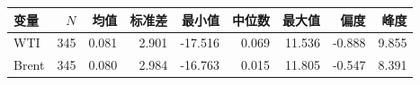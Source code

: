 \begin{tabular}{lrrrrrrrr}
\toprule
变量 & $N$ & 均值 & 标准差 & 最小值 & 中位数 & 最大值 & 偏度 & 峰度 \\
\midrule
WTI & 345 & 0.081 & 2.901 & -17.516 & 0.069 & 11.536 & -0.888 & 9.855 \\
Brent & 345 & 0.080 & 2.984 & -16.763 & 0.015 & 11.805 & -0.547 & 8.391 \\
\bottomrule
\end{tabular}
